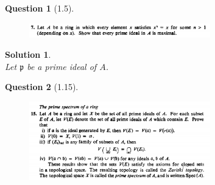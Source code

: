 \documentclass[11pt]{article}
\theoremstyle{plain}
\theoremstyle{quest}
\newtheorem*{question}{Question}
\newtheorem*{solution}{Solution}
\begin{document}
\bigskip

\begin{question}[1.5]
\hfill
\begin{figure}[h!]
  \centering
    \includegraphics[width=0.7\textwidth]{d-1-7.png}
\end{figure}
\end{question}
\begin{solution} \hfill \\
Let $\mathfrak{p}$ be a prime ideal of $A$. 

\end{solution}

\newpage

\begin{question}[1.15]
\hfill
\begin{figure}[h!]
  \centering
    \includegraphics[width=0.7\textwidth]{d-1-15.png}
\end{figure}
\end{question}
\end{document}
